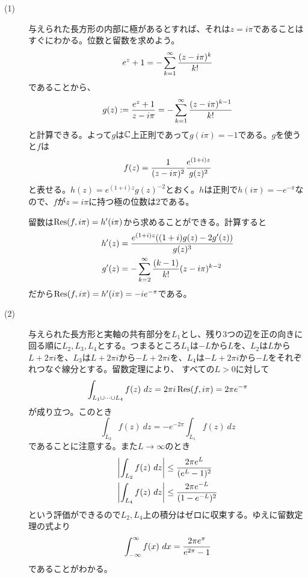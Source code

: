 \subsubsection{}%
\begin{sol} ${}$
\begin{description}
  \item[(1)] 与えられた長方形の内部に極があるとすれば、それは$z = i \pi$であることはすぐにわかる。位数と留数を求めよう。
  \[
  e^z + 1 = - \sum_{k=1}^{\infty} \frac{ (z-i \pi)^k }{ k! }
  \]
  であることから、
  \[
  g(z) := \frac{ e^z + 1 }{ z - i \pi } = - \sum_{k=1}^{\infty} \frac{ (z-i \pi)^{k-1} }{ k! }
  \]
  と計算できる。よって$g$は${\mathbb C}$上正則であって$g(i \pi) = -1$である。$g$を使うと$f$は
  \[
  f(z) = \frac{1}{(z- i \pi)^2 } \frac{ e^{ (1+i)z } }{g(z)^2}
  \]
  と表せる。$h(z) = e^{(1+i)z}g(z)^{-2}$とおく。$h$は正則で$h(i \pi)=- e^{- \pi}$なので、$f$が$z = i \pi$に持つ極の位数は$2$である。

  留数は$\operatorname{Res}(f, i \pi) = h'(i \pi)$から求めることができる。計算すると
  \begin{align*}
    h'(z) &= \frac{ e^{(1+i)z} (   (1+i)g(z)- 2 g'(z) ) }{ g(z)^3  } \\
    g'(z) &= - \sum_{k=2}^{\infty} \frac{ (k-1)  }{ k! } (z-i \pi)^{k-2}
  \end{align*}
  だから$\operatorname{Res}(f, i \pi) = h'(i \pi) = - ie^{- \pi}$である。
  \item[(2)] 与えられた長方形と実軸の共有部分を$L_1$とし、残り$3$つの辺を正の向きに回る順に$L_2, L_3, L_4$とする。つまるところ$L_1$は$-L$から$L$を、$L_2$は$L$から$L + 2 \pi i$を、$L_3$は$L + 2 \pi i$から$-L + 2 \pi i$を、$L_4$は$-L + 2 \pi i$から$-L$をそれぞれつなぐ線分とする。留数定理により、
  すべての$L > 0$に対して
  \[
  \int_{L_1 \cup \cdots \cup L_4} f(z) \ dz = 2 \pi i \operatorname{Res}(f, i \pi) = 2 \pi e^{- \pi}
  \]
  が成り立つ。このとき
  \[
  \int_{L_3} f(z) \ dz = - e^{- 2 \pi} \int_{L_1} f(z) \ dz
  \]
であることに注意する。また$L \to \infty$のとき
\begin{align*}
  \left \lvert  \int_{L_2} f(z) \ dz  \right \rvert &\leq \frac{ 2 \pi e^L}{ (e^L - 1)^2  } \\
  \left \lvert  \int_{L_4} f(z) \ dz  \right \rvert &\leq \frac{ 2 \pi e^{-L}  }{ (1 - e^{-L})^2  }
\end{align*}
という評価ができるので$L_2, L_4$上の積分はゼロに収束する。ゆえに留数定理の式より
\[
 \int_{- \infty}^{ \infty} f(x) \ dx = \frac{ 2 \pi e^{\pi}  }{ e^{2 \pi} -1 }
\]
であることがわかる。
\end{description}
\end{sol}
